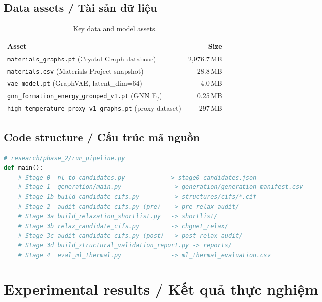\documentclass[11pt,a4paper]{report}
\begin{document}
\section{Data assets / Tài sản dữ liệu}

\begin{table}[h]
\centering
\caption{Key data and model assets.}
\label{tab:assets}
\begin{tabular}{lr}
\toprule
\textbf{Asset} & \textbf{Size} \\
\midrule
\texttt{materials\_graphs.pt} (Crystal Graph database) & 2{,}976.7\,MB \\
\texttt{materials.csv} (Materials Project snapshot) & 28.8\,MB \\
\texttt{vae\_model.pt} (GraphVAE, latent\_dim=64) & 4.0\,MB \\
\texttt{gnn\_formation\_energy\_grouped\_v1.pt} (GNN E$_f$) & 0.25\,MB \\
\texttt{high\_temperature\_proxy\_v1\_graphs.pt} (proxy dataset) & 297\,MB \\
\bottomrule
\end{tabular}
\end{table}

\section{Code structure / Cấu trúc mã nguồn}

\begin{lstlisting}[language=Python,caption={Top-level orchestrator entry point.},label={lst:entry}]
# research/phase_2/run_pipeline.py
def main():
    # Stage 0  nl_to_candidates.py            -> stage0_candidates.json
    # Stage 1  generation/main.py              -> generation/generation_manifest.csv
    # Stage 1b build_candidate_cifs.py         -> structures/cifs/*.cif
    # Stage 2  audit_candidate_cifs.py (pre)   -> pre_relax_audit/
    # Stage 3a build_relaxation_shortlist.py   -> shortlist/
    # Stage 3b relax_candidate_cifs.py         -> chgnet_relax/
    # Stage 3c audit_candidate_cifs.py (post)  -> post_relax_audit/
    # Stage 3d build_structural_validation_report.py -> reports/
    # Stage 4  eval_ml_thermal.py              -> ml_thermal_evaluation.csv
\end{lstlisting}

\chapter{Experimental results / Kết quả thực nghiệm}
\end{document}
